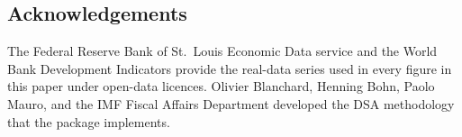 \subsection*{Acknowledgements}\label{acknowledgements}

The Federal Reserve Bank of St.~Louis Economic Data service and the
World Bank Development Indicators provide the real-data series used in
every figure in this paper under open-data licences. Olivier Blanchard,
Henning Bohn, Paolo Mauro, and the IMF Fiscal Affairs Department
developed the DSA methodology that the package implements.



\address{%
Charles Coverdale\\
London, United Kingdom\\%
United Kingdom\\
%
\url{https://github.com/charlescoverdale/debtkit}\\%
%
\href{mailto:charles.f.coverdale@gmail.com}{\nolinkurl{charles.f.coverdale@gmail.com}}%
}
